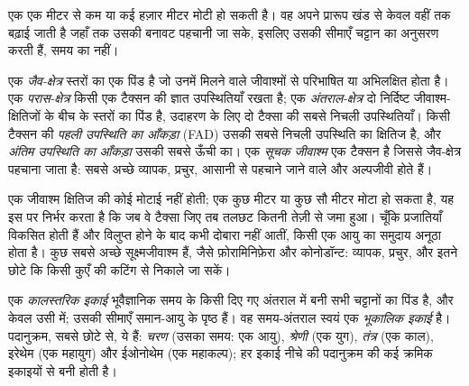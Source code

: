 एक  एक मीटर से कम या कई हज़ार मीटर मोटी हो सकती है। वह अपने प्रारूप खंड से केवल वहीं तक बढ़ाई जाती है जहाँ तक उसकी बनावट पहचानी जा सके, इसलिए उसकी सीमाएँ चट्टान का अनुसरण करती हैं, समय का नहीं।

\begin{definition}\label{def:b1:stratigraphic-scale:biozone}
एक \emph{जैव-क्षेत्र} स्तरों का एक पिंड है जो उनमें मिलने वाले जीवाश्मों से परिभाषित या अभिलक्षित होता है। एक \emph{परास-क्षेत्र} किसी एक टैक्सन की ज्ञात उपस्थितियाँ रखता है; एक \emph{अंतराल-क्षेत्र} दो निर्दिष्ट जीवाश्म-क्षितिजों के बीच के स्तरों का पिंड है, उदाहरण के लिए दो टैक्सा की सबसे निचली उपस्थितियाँ। किसी टैक्सन की \emph{पहली उपस्थिति का आँकड़ा} (FAD) उसकी सबसे निचली उपस्थिति का क्षितिज है, और \emph{अंतिम उपस्थिति का आँकड़ा} उसकी सबसे ऊँची का। एक \emph{सूचक जीवाश्म} एक टैक्सन है जिससे जैव-क्षेत्र पहचाना जाता है: सबसे अच्छे व्यापक, प्रचुर, आसानी से पहचाने जाने वाले और अल्पजीवी होते हैं।
\end{definition}

एक जीवाश्म क्षितिज की कोई मोटाई नहीं होती; एक  कुछ मीटर या कुछ सौ मीटर मोटा हो सकता है, यह इस पर निर्भर करता है कि जब वे टैक्सा जिए तब तलछट कितनी तेज़ी से जमा हुआ। चूँकि प्रजातियाँ विकसित होती हैं और विलुप्त होने के बाद कभी दोबारा नहीं आतीं, किसी एक आयु का समुदाय अनूठा होता है। कुछ सबसे अच्छे  सूक्ष्मजीवाश्म हैं, जैसे फ़ोरामिनिफ़ेरा और कोनोडॉन्ट: व्यापक, प्रचुर, और इतने छोटे कि किसी कुएँ की कटिंग से निकाले जा सकें।

\begin{definition}[कालस्तरिक और भूकालिक इकाइयाँ]\label{def:b1:stratigraphic-scale:chronostratigraphy}
एक \emph{कालस्तरिक इकाई} भूवैज्ञानिक समय के किसी दिए गए अंतराल में बनी सभी चट्टानों का पिंड है, और केवल उसी में; उसकी सीमाएँ समान-आयु के पृष्ठ हैं। वह समय-अंतराल स्वयं एक \emph{भूकालिक इकाई} है। पदानुक्रम, सबसे छोटे से, ये हैं: \emph{चरण} (उसका समय: एक आयु), \emph{श्रेणी} (एक युग), \emph{तंत्र} (एक काल), इरेथेम (एक महायुग) और ईओनोथेम (एक महाकल्प); हर इकाई नीचे की पदानुक्रम की कई क्रमिक इकाइयों से बनी होती है।
\end{definition}

